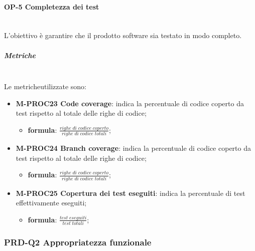 	\paragraph{OP-5 Completezza dei test} \mbox{} \\ [1mm]
	L'obiettivo è garantire che il prodotto software sia testato in modo completo.
	\subparagraph{Metriche}\mbox{}\\ [1mm]
	Le metriche\glosp utilizzate sono:
	\begin{itemize}
		\item \textbf{M-PROC23 Code coverage}: indica la percentuale di codice coperto da test rispetto al totale delle righe di codice;
		\begin{itemize}
			\item[] \textbf{formula}: $\frac{righe \; di \; codice \; coperto}{righe \; di \; codice \; totali}$;
		\end{itemize} 
	
		\item \textbf{M-PROC24 Branch coverage}: indica la percentuale di codice coperto da test rispetto al totale delle righe di codice;
		\begin{itemize}
			\item[] \textbf{formula}: $\frac{righe \; di \; codice \; coperto}{righe \; di \; codice \; totali}$;
		\end{itemize} 
	
		\item \textbf{M-PROC25 Copertura dei test eseguiti}: indica la percentuale di test effettivamente eseguiti;
		\begin{itemize}
			\item[] \textbf{formula}: $\frac{test \; eseguiti}{test \; totali}$;
		\end{itemize} 
	\end{itemize}
\subsubsection{PRD-Q2 Appropriatezza funzionale}
